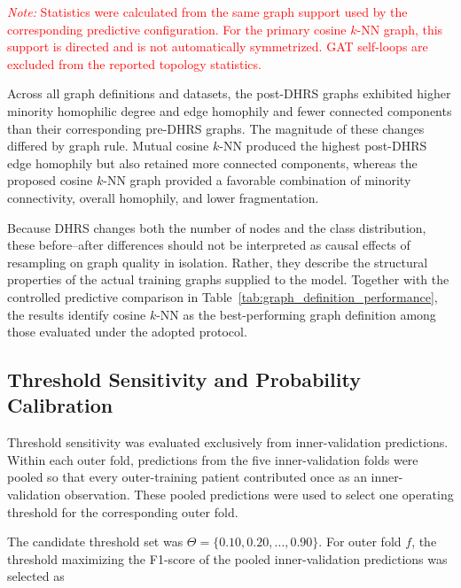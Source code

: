 \documentclass[pdflatex,sn-mathphys-num]{sn-jnl}%
\theoremstyle{thmstyleone}%
\theoremstyle{thmstyletwo}%
\theoremstyle{thmstylethree}%
\begin{document}
\begin{table}[!ht]
\vspace{2pt}

\begin{minipage}{0.98\textwidth}
\footnotesize
\textcolor{red}{
\textit{Note:} Statistics were calculated from the same graph support used by
the corresponding predictive configuration. For the primary cosine
\(k\)-NN graph, this support is directed and is not automatically
symmetrized. GAT self-loops are excluded from the reported topology
statistics.
}
\end{minipage}
\end{table}

 {
Across all graph definitions and datasets, the post-DHRS graphs exhibited
higher minority homophilic degree and edge homophily and fewer connected
components than their corresponding pre-DHRS graphs. The magnitude of these
changes differed by graph rule. Mutual cosine \(k\)-NN produced the highest
post-DHRS edge homophily but also retained more connected components, whereas
the proposed cosine \(k\)-NN graph provided a favorable combination of
minority connectivity, overall homophily, and lower fragmentation.
}

 {
Because DHRS changes both the number of nodes and the class distribution,
these before--after differences should not be interpreted as causal effects
of resampling on graph quality in isolation. Rather, they describe the
structural properties of the actual training graphs supplied to the model.
Together with the controlled predictive comparison in
Table~\ref{tab:graph_definition_performance}, the results identify cosine
\(k\)-NN as the best-performing graph definition among those evaluated under
the adopted protocol.
}
\subsection{Threshold Sensitivity and Probability Calibration}

\label{subsec:threshold_calibration}

 {
Threshold sensitivity was evaluated exclusively from inner-validation
predictions. Within each outer fold, predictions from the five inner-validation
folds were pooled so that every outer-training patient contributed once as an
inner-validation observation. These pooled predictions were used to select
one operating threshold for the corresponding outer fold.
}

The candidate threshold set was
\(\Theta=\{0.10,0.20,\ldots,0.90\}\). For outer fold \(f\), the threshold
maximizing the F1-score of the pooled inner-validation predictions was
selected as
\end{document}
